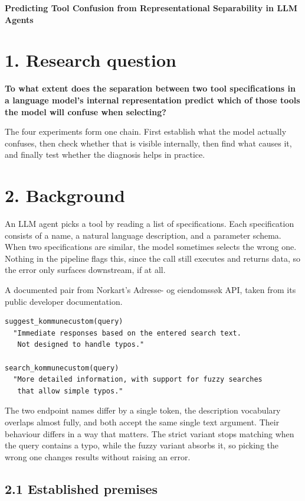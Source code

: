\documentclass[11pt,a4paper]{article}
\begin{document}
{\Large\textbf{Predicting Tool Confusion from Representational Separability in LLM Agents}}

\section*{1. Research question}

\textbf{To what extent does the separation between two tool specifications in a language model's
internal representation predict which of those tools the model will confuse when selecting?}

The four experiments form one chain. First establish what the model actually confuses, then check
whether that is visible internally, then find what causes it, and finally test whether the
diagnosis helps in practice.

\section*{2. Background}

An LLM agent picks a tool by reading a list of specifications. Each specification consists of a
name, a natural language description, and a parameter schema. When two specifications are similar,
the model sometimes selects the wrong one. Nothing in the pipeline flags this, since the call
still executes and returns data, so the error only surfaces downstream, if at all.

A documented pair from Norkart's Adresse- og eiendomss{\o}k API, taken from its public developer
documentation.

\begin{verbatim}
suggest_kommunecustom(query)
  "Immediate responses based on the entered search text.
   Not designed to handle typos."

search_kommunecustom(query)
  "More detailed information, with support for fuzzy searches
   that allow simple typos."
\end{verbatim}

The two endpoint names differ by a single token, the description vocabulary overlaps almost
fully, and both accept the same single text argument. Their behaviour differs in a way that
matters. The strict variant stops matching when the query contains a typo, while the fuzzy
variant absorbs it, so picking the wrong one changes results without raising an error.

\subsection*{2.1 Established premises}
\end{document}
